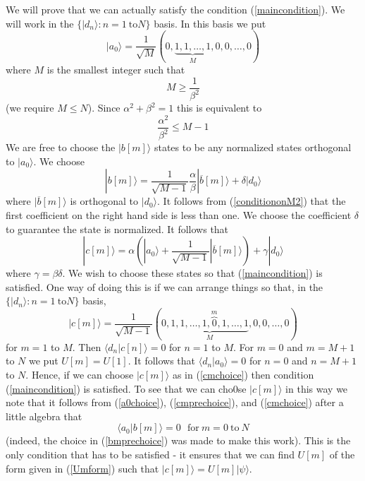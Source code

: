 \documentclass[12pt]{article}
\begin{document}
We will prove that we can actually satisfy the condition (\ref{maincondition}).  We will work in the $\{|d_n\rangle:n=1~\text{to} N\}$ basis.  In this basis we put
\begin{equation}\label{a0choice} |a_0\rangle = \frac{1}{\sqrt{M}}(0, \underbrace{1, 1, \dots, 1}_M, 0, 0,\dots, 0) \end{equation} where $M$ is the smallest integer such that
\begin{equation}\label{conditiononM} M \geq \frac{1}{\beta^2} \end{equation} (we require $M\leq N$).  Since $\alpha^2+\beta^2=1$ this is equivalent to \begin{equation}\label{conditiononM2}
\frac{\alpha^2}{\beta^2} \leq M-1 \end{equation} We are free to choose the $|b[m]\rangle$ states to be any normalized states orthogonal to $|a_0\rangle$. We choose
\begin{equation}\label{bmprechoice} |b[m]\rangle = \frac{1}{\sqrt{M-1}} \frac{\alpha}{\beta} |\overline{b}[m]\rangle + \delta |d_0\rangle \end{equation} where $|\overline{b}[m]\rangle$ is
orthogonal to $|d_0\rangle$.  It follows from (\ref{conditiononM2}) that the first coefficient on the right hand side is less than one.  We choose the coefficient $\delta$ to guarantee the
state is normalized.  It follows that \begin{equation}\label{cmprechoice} |c[m]\rangle = \alpha  (|a_0\rangle + \frac{1}{\sqrt{M-1}}|\overline{b}[m]\rangle) + \gamma |d_0\rangle
\end{equation} where $\gamma=\beta\delta$.  We wish to choose these states so that (\ref{maincondition}) is satisfied.  One way of doing this is if we can arrange things so that, in the
$\{|d_n\rangle:n=1~\text{to} N\}$ basis, \begin{equation}\label{cmchoice} |c[m]\rangle = \frac{1}{\sqrt{M-1}}(0,\underbrace{1, 1, \dots, 1, \overbrace{0}^m, 1, \dots ,1}_M, 0, 0, \dots, 0)
\end{equation} for $m=1$ to $M$.  Then $\langle d_n|c[n]\rangle=0$ for $n=1$ to $M$.  For $m=0$ and $m=M+1$ to $N$ we put $U[m]=U[1]$.  It follows that $\langle d_n|a_0\rangle = 0$ for $n=0$
and $n=M+1$ to $N$.   Hence, if we can choose $|c[m]\rangle$ as in (\ref{cmchoice}) then condition (\ref{maincondition}) is satisfied.  To see that we can cho0se $|c[m]\rangle$  in this way
we note that it follows from (\ref{a0choice}), (\ref{cmprechoice}), and (\ref{cmchoice}) after a little algebra that \begin{equation} \langle a_0| b[m] \rangle = 0 ~~~ \text{for} ~m=0
~\text{to}~N \end{equation} (indeed, the choice in (\ref{bmprechoice}) was made to make this work).  This is the only condition that has to be satisfied - it ensures that we can find $U[m]$
of the form given in (\ref{Umform}) such that $|c[m]\rangle=U[m]|\psi\rangle$.
\end{document}
